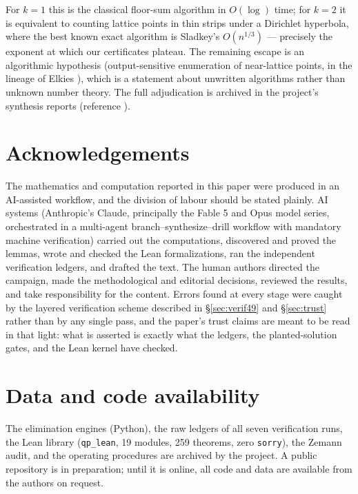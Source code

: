 \documentclass[11pt]{article}
\theoremstyle{remark}
\begin{document}
For $k = 1$ this is the classical floor-sum algorithm in $O(\log)$ time; for $k = 2$ it is equivalent to counting lattice points in thin strips under a Dirichlet hyperbola, where the best known exact algorithm is Sladkey's $O(n^{1/3})$ \cite{sladkey} --- precisely the exponent at which our certificates plateau. The remaining escape is an algorithmic hypothesis (output-sensitive enumeration of near-lattice points, in the lineage of Elkies \cite{elkies}), which is a statement about unwritten algorithms rather than unknown number theory. The full adjudication is archived in the project's synthesis reports (reference \cite{internal}).

\section*{Acknowledgements}

The mathematics and computation reported in this paper were produced in an AI-assisted workflow, and the division of labour should be stated plainly. AI systems (Anthropic's Claude, principally the Fable 5 and Opus model series, orchestrated in a multi-agent branch--synthesize--drill workflow with mandatory machine verification) carried out the computations, discovered and proved the lemmas, wrote and checked the Lean formalizations, ran the independent verification ledgers, and drafted the text. The human authors directed the campaign, made the methodological and editorial decisions, reviewed the results, and take responsibility for the content. Errors found at every stage were caught by the layered verification scheme described in \S\ref{sec:verif49} and \S\ref{sec:trust} rather than by any single pass, and the paper's trust claims are meant to be read in that light: what is asserted is exactly what the ledgers, the planted-solution gates, and the Lean kernel have checked.

\section*{Data and code availability}

The elimination engines (Python), the raw ledgers of all seven verification runs, the Lean library (\texttt{qp\_lean}, 19 modules, 259 theorems, zero \texttt{sorry}), the Zemann audit, and the operating procedures are archived by the project. A public repository is in preparation; until it is online, all code and data are available from the authors on request.
\end{document}
